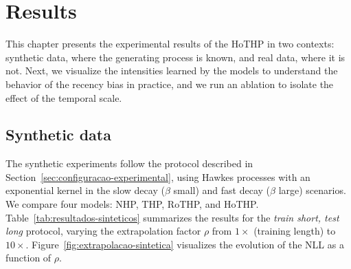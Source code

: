 \chapter{Results}
\label{chap:resultados}

This chapter presents the experimental results of the HoTHP in two contexts: synthetic data, where the generating process is known, and real data, where it is not. Next, we visualize the intensities learned by the models to understand the behavior of the recency bias in practice, and we run an ablation to isolate the effect of the temporal scale.

\section{Synthetic data}
\label{sec:resultados-sinteticos}

The synthetic experiments follow the protocol described in Section~\ref{sec:configuracao-experimental}, using Hawkes processes with an exponential kernel in the slow decay ($\beta$ small) and fast decay ($\beta$ large) scenarios. We compare four models: NHP, THP, RoTHP, and HoTHP. Table~\ref{tab:resultados-sinteticos} summarizes the results for the \textit{train short, test long} protocol, varying the extrapolation factor $\rho$ from $1\times$ (training length) to $10\times$. Figure~\ref{fig:extrapolacao-sintetica} visualizes the evolution of the NLL as a function of $\rho$.


